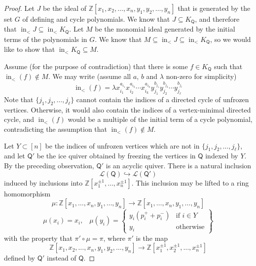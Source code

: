 \documentclass[ALCO,published]{cedram}
\numberwithin{equation}{section}
\newcommand{\Z}{\mathbb{Z}}
\renewcommand{\L}{\mathcal{L}}%
\DeclareMathOperator{\In}{\mathrm{in}}
\newcommand{\1}{^{-1}}
\def\ZZ{\mathbb{Z}}
\def\Q{\mathsf{Q}}
\begin{document}
\begin{proof}
Let $J$ be the ideal of $\Z[x_1,x_2,\dots,x_n,y_1,y_2,\dots,y_n]$ that is generated by the set $G$ of defining and cycle polynomials. We know that $J \subseteq K_\Q$, and therefore that $\In_< J \subseteq \In_< K_\Q$. Let $M$ be the monomial ideal generated by the initial terms of the polynomials in $G$.  We know that $M \subseteq \In_< J \subseteq \In_< K_\Q$, so we would like to show that $\In_< K_\Q \subseteq M$. 

Assume (for the purpose of contradiction) that there is some $f\in K_\Q$ such that $\In_<(f)\not\in M$.  We may write
(assume all $a$, $b$ and $\lambda$ non-zero for simplicity)
\begin{equation}\label{form}
\In_<(f)= \lambda x_{i_1}^{a_{i_1}} x_{i_2}^{a_{i_2}} \cdots x_{i_k}^{a_{i_k}} y_{j_1}^{b_{j_1}} y_{j_2}^{b_{j_2}} \cdots y_{j_\ell}^{b_{j_\ell}}
\end{equation}
Note that $\{j_1,j_2,\dots,j_\ell\}$ cannot contain the indices of a directed cycle of unfrozen vertices. Otherwise, it would also contain the indices of a vertex-minimal directed cycle, and $\In_<(f)$ would be a multiple of the initial term of a cycle polynomial, contradicting the assumption that $\In_<(f)\not\in M$.
%

Let $Y\subset [n]$ be the indices of unfrozen vertices which are not in $\{j_1,j_2,\dots,j_\ell\}$, and let $\Q'$ be the ice quiver obtained by freezing the vertices in $\Q$ indexed by $Y$.  By the preceding observation, $\Q'$ is an acyclic quiver.
%
%
There is a natural inclusion
\[ \L(\Q)\hookrightarrow \L(\Q') \]
induced by inclusions into $\ZZ[x_1^{\pm1},\dots,x_n^{\pm1}]$.  This inclusion may be lifted to a ring homomorphism
\[ \mu: \ZZ[x_1,\dots,x_n,y_1,\dots,y_n]\rightarrow \ZZ[x_1,\dots,x_n,y_1,\dots,y_n]\]
\[ \mu(x_i)=x_i,\;\;\; \mu(y_i) = \left\{\begin{array}{cc}
y_i(p_i^++p_i^-) & \text{if }i\in Y \\
y_i & \text{otherwise}
\end{array}\right\}\]
with the property that $\pi'\circ \mu = \pi$, where $\pi'$ is the map
\[ \ZZ[x_1,x_2,\dots,x_n,y_1,y_2,\dots,y_n]\longrightarrow \ZZ[x_1^{\pm1},x_2^{\pm1},\dots,x_n^{\pm1} ]\]
defined by $\Q'$ instead of $\Q$.  


\end{proof}
\end{document}
